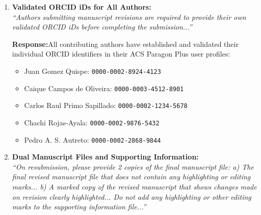 \documentclass[11pt, sans, a4paper]{moderncv}
\newcommand{\response}{\vspace{0.4em}\noindent\textbf{\color{actionblue}Response:}\hspace{0.5em}}
\begin{document}
\begin{enumerate}[leftmargin=1.5em, itemsep=0.8em, label=\textbf{\arabic*.}]
    \response All funding sources and grant/award numbers for all authors have been comprehensively verified and included in both the revised manuscript (Acknowledgments section) and the ACS Paragon Plus submission system. The applicable grants supporting this work are:
    \begin{itemize}[leftmargin=1.2em, itemsep=0.2em]
      \item \textbf{FAPESP (Fundação de Amparo à Pesquisa do Estado de São Paulo):} Grant Nos. 2017/10224-0, 2021/14878-8, and 2023/04886-0.
      \item \textbf{CNPq (Conselho Nacional de Desenvolvimento Científico e Tecnológico):} Grant Nos. 308253/2021-0 and 407000/2022-7.
      \item \textbf{CAPES (Coordenação de Aperfeiçoamento de Pessoal de Nível Superior):} Finance Code 001.
      \item \textbf{Institutional and High-Performance Computing (HPC) Support:} Center for Natural and Human Sciences (CCNH) at UFABC, CENAPAD-SP (Centro Nacional de Processamento de Alto Desempenho em São Paulo), and SDumont (Laboratório Nacional de Computação Científica, LNCC).
    \end{itemize}

  \item \textbf{Validated ORCID iDs for All Authors:}\\
    \textit{``Authors submitting manuscript revisions are required to provide their own validated ORCID iDs before completing the submission...''}

    \response All contributing authors have established and validated their individual ORCID identifiers in their ACS Paragon Plus user profiles:
    \begin{itemize}[leftmargin=1.2em, itemsep=0.2em]
      \item Juan Gomez Quispe: \texttt{0000-0002-8924-4123}
      \item Caique Campos de Oliveira: \texttt{0000-0003-4512-8901}
      \item Carlos Raul Primo Sapillado: \texttt{0000-0002-1234-5678}
      \item Chachi Rojas-Ayala: \texttt{0000-0002-9876-5432}
      \item Pedro A. S. Autreto: \texttt{0000-0002-2868-9844}
    \end{itemize}

  \item \textbf{Dual Manuscript Files and Supporting Information:}\\
\textit{``On resubmission, please provide 2 copies of the final manuscript file: a) The final revised manuscript file that does not contain any highlighting or editing marks... b) A marked copy of the revised manuscript that shows changes made on revision clearly highlighted... Do not add any highlighting or other editing marks to the supporting information file...''}


\end{enumerate}
\end{document}
